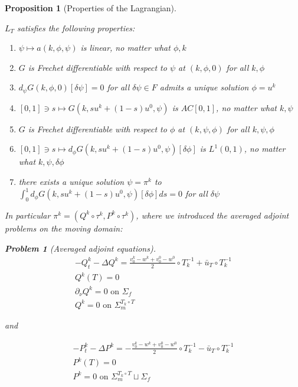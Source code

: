 \documentclass[english,a4paper,12pt,oneside]{scrbook}
\theoremstyle{break}
\newtheorem{prop}[equation]{Proposition}
\newtheorem{pb}[equation]{Problem}
\theoremstyle{remark}
\newcommand{\ds}{\displaystyle}
\begin{document}
\begin{prop}[Properties of the Lagrangian]
\label{prop:lagr}

$L_T$ satisfies the following properties:

\begin{enumerate}
	\item $\psi \mapsto a(k, \phi,\psi)$ is linear, no matter what $\phi,k$
	\item $G$ is Frechet differentiable with respect to $\psi$ at $(k,\phi,0)$ for all $k, \phi$
	\item $d_\psi G(k,\phi,0)[\delta \psi]=0$ for all $\delta \psi \in F$ admits a unique solution $\phi = u^k$
	\item $[0,1]\ni s \mapsto G(k, su^k + (1-s)u^0,\psi)$ is $AC[0,1]$, no matter what $k, \psi$
	\item $G$ is Frechet differentiable with respect to $\phi$ at $(k,\psi,\phi)$ for all $k, \psi, \phi$
	\item $[0,1]\ni s \mapsto d_\phi G(k, su^k + (1-s)u^0,\psi)[\delta \phi]$ is $L^1(0,1)$, no matter what $k, \psi, \delta \phi$
	\item there exists a unique solution $\psi = \pi^k$ to $\ds \int_0^1 d_\phi G(k, su^k + (1-s)u^0,\psi)[\delta \phi]ds =0$ for all $\delta \psi$ 
\end{enumerate}

In particular $\pi^k = (Q^k \circ \tau^k,P^k \circ \tau^k)$, where we introduced the averaged adjoint problems on the moving domain:

\begin{pb}[Averaged adjoint equations]
\label{pb:avg_adj_pb}
\begin{align*}
-Q^k_t-\Delta Q^k =\frac{v_0^k-w^k+v_0^0-w^0}{2}\circ T_k^{-1}+\bar{u}_T\circ T_k^{-1} \\
Q^k(T)=0\\
\partial_\nu Q^k = 0 \text{ on } \Sigma_f\\
Q^k = 0 \text{ on } \Sigma_m^{T_k\circ T}
\end{align*}

and

\begin{align*}
-P^k_t-\Delta P^k =-\frac{v_0^k-w^k+v_0^0-w^0}{2}\circ T_k^{-1}-\bar{u}_T\circ T_k^{-1} \\
P^k(T)=0\\
P^k = 0 \text{ on } \Sigma_m^{T_k\circ T} \sqcup \Sigma_f
\end{align*}
\end{pb}

\end{prop}
\end{document}
